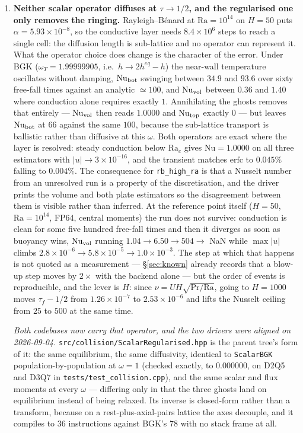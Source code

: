 \documentclass[11pt,a4paper]{article}
\newcommand{\code}[1]{\texttt{\small #1}}
\newcommand{\e}[1]{\times 10^{#1}}
\begin{document}
\begin{enumerate}[leftmargin=1.4em,itemsep=4pt]
\item \textbf{Neither scalar operator diffuses at $\tau\to1/2$, and the
  regularised one only removes the ringing.} Rayleigh--B\'enard at
  $\mathrm{Ra}=10^{14}$ on $H=50$ puts $\alpha=5.93\e{-8}$, so the conductive
  layer needs $8.4\e{6}$ steps to reach a single cell: the diffusion length is
  sub-lattice and no operator can represent it. What the operator choice does
  change is the character of the error. Under BGK ($\omega_T=1.99999905$,
  i.e.\ $h\to2h^{eq}-h$) the near-wall temperature oscillates without damping,
  $\mathrm{Nu}_{\rm bot}$ swinging between $34.9$ and $93.6$ over sixty
  free-fall times against an analytic $\simeq100$, and $\mathrm{Nu}_{\rm vol}$
  between $0.36$ and $1.40$ where conduction alone requires exactly $1$.
  Annihilating the ghosts removes that entirely --- $\mathrm{Nu}_{\rm vol}$ then
  reads $1.0000$ and $\mathrm{Nu}_{\rm top}$ exactly $0$ --- but leaves
  $\mathrm{Nu}_{\rm bot}$ at $66$ against the same $100$, because the sub-lattice
  transport is ballistic rather than diffusive at this $\omega$. Both operators
  are exact where the layer is resolved: steady conduction below
  $\mathrm{Ra}_c$ gives $\mathrm{Nu}=1.0000$ on all three estimators with
  $|u|\to3\e{-16}$, and the transient matches $\mathrm{erfc}$ to $0.045\%$
  falling to $0.004\%$. The consequence for \code{rb\_high\_ra} is that a
  Nusselt number from an unresolved run is a property of the discretisation, and
  the driver prints the volume and both plate estimators so the disagreement
  between them is visible rather than inferred. At the reference point itself
  ($H=50$, $\mathrm{Ra}=10^{14}$, FP64, central moments) the run does not
  survive: conduction is clean for some five hundred free-fall times and then it
  diverges as soon as buoyancy wins, $\mathrm{Nu}_{\rm vol}$ running
  $1.04\to6.50\to504\to$ NaN while $\max|u|$ climbs
  $2.8\e{-6}\to5.8\e{-5}\to1.0\e{-3}$. The step at which that happens is not
  quoted as a measurement --- \S\ref{sec:known} already records that a
  blow-up step moves by $2\times$ with the backend alone --- but the order of
  events is reproducible, and the lever is $H$: since
  $\nu=UH\sqrt{\mathrm{Pr}/\mathrm{Ra}}$, going to $H=1000$ moves
  $\tau_f-1/2$ from $1.26\e{-7}$ to $2.53\e{-6}$ and lifts the Nusselt ceiling
  from $25$ to $500$ at the same time.

  \emph{Both codebases now carry that operator, and the two drivers were aligned
  on 2026-09-04.} \code{src/collision/ScalarRegularised.hpp} is the parent
  tree's form of it: the same equilibrium, the same diffusivity, identical to
  \code{ScalarBGK} population-by-population at $\omega=1$ (checked exactly, to
  $0.000000$, on D2Q5 and D3Q7 in \code{tests/test\_collision.cpp}), and the
  same scalar and flux moments at every $\omega$ --- differing only in that the
  three ghosts land on equilibrium instead of being relaxed. Its inverse is
  closed-form rather than a transform, because on a rest-plus-axial-pairs
  lattice the axes decouple, and it compiles to 36 instructions against BGK's
  78 with no stack frame at all.


\end{enumerate}
\end{document}

